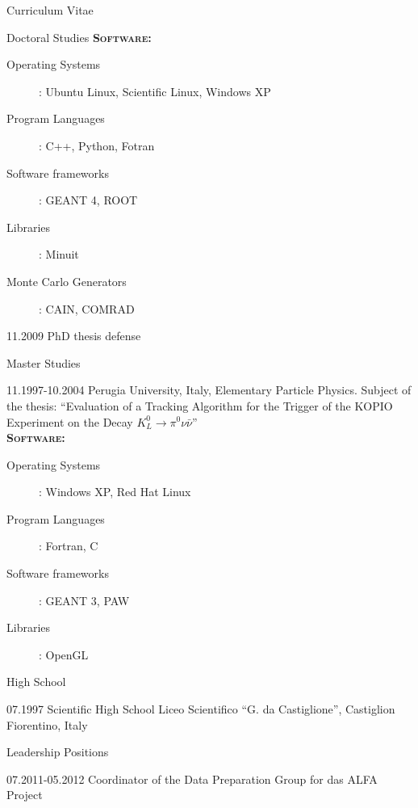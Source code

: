 \documentclass[11pt,a4paper]{scrartcl}
\begin{document}
\begin{cv}{Curriculum Vitae}
\begin{cvlist}{Doctoral Studies}
{\scshape {\bfseries Software:}}
\begin{description}
\item[Operating Systems] : Ubuntu Linux, Scientific Linux, Windows XP
\item[Program Languages] : C++, Python, Fotran
\item[Software frameworks] : GEANT 4, ROOT
\item[Libraries] : Minuit
\item[Monte Carlo Generators] : CAIN, COMRAD
\end{description}

\item[11.2009] PhD thesis defense

\end{cvlist}

\begin{cvlist}{Master Studies}
\item [11.1997-10.2004]Perugia University, Italy, Elementary Particle Physics.
Subject of the thesis:
"`Evaluation of a Tracking Algorithm for the Trigger of the KOPIO Experiment on the Decay
$K_L^0\rightarrow\pi^0\nu\bar{\nu}$"'\\

{\scshape {\bfseries Software:}}
\begin{description}
\item[Operating Systems] : Windows XP, Red Hat Linux
\item[Program Languages] : Fortran, C
\item[Software frameworks] : GEANT 3, PAW
\item[Libraries] : OpenGL
\end{description}
\end{cvlist}

\begin{cvlist}{High School}
\item[07.1997] Scientific High School Liceo Scientifico "`G. da
Castiglione"', Castiglion Fiorentino, Italy
\end{cvlist}

\begin{cvlist}{Leadership Positions}
\item [07.2011-05.2012] Coordinator of the Data Preparation Group for das ALFA
Project
\end{cvlist}


\end{cv}
\end{document}
